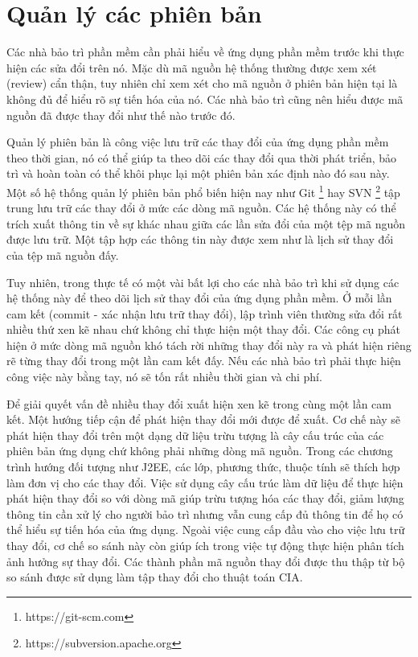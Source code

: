 \documentclass[12pt]{report}
\begin{document}
\chapter{Quản lý các phiên bản}
Các nhà bảo trì phần mềm cần phải hiểu về ứng dụng phần mềm trước khi thực hiện các sửa đổi trên nó. Mặc dù mã nguồn hệ thống thường được xem xét (review) cẩn thận, tuy nhiên chỉ xem xét cho mã nguồn ở phiên bản hiện tại là không đủ để hiểu rõ sự tiến hóa của nó. Các nhà bảo trì cũng nên hiểu được mã nguồn đã được thay đổi như thế nào trước đó.

Quản lý phiên bản là công việc lưu trữ các thay đổi của ứng dụng phần mềm theo thời gian, nó có thể giúp ta theo dõi các thay đổi qua thời phát triển, bảo trì và hoàn toàn có thể khôi phục lại một phiên bản xác định nào đó sau này. Một số hệ thống quản lý phiên bản phổ biến hiện nay như Git \footnote{https://git-scm.com} hay SVN  \footnote{https://subversion.apache.org} tập trung lưu trữ các thay đổi ở mức các dòng mã nguồn. Các hệ thống này có thể trích xuất thông tin về sự khác nhau giữa các lần sửa đổi của một tệp mã nguồn được lưu trữ. Một tập hợp các thông tin này được xem như là lịch sử thay đổi của tệp mã nguồn đấy.

Tuy nhiên, trong thực tế có một vài bất lợi cho các nhà bảo trì khi sử dụng các hệ thống này để theo dõi lịch sử thay đổi của ứng dụng phần mềm. Ở mỗi lần cam kết (commit - xác nhận lưu trữ thay đổi), lập trình viên thường sửa đổi rất nhiều thứ xen kẽ nhau chứ không chỉ thực hiện một thay đổi. Các công cụ phát hiện ở mức dòng mã nguồn khó tách rời những thay đổi này ra và phát hiện riêng rẽ từng thay đổi trong một lần cam kết đấy. Nếu các nhà bảo trì phải thực hiện công việc này bằng tay, nó sẽ tốn rất nhiều thời gian và chi phí.

Để giải quyết vấn đề nhiều thay đổi xuất hiện xen kẽ trong cùng một lần cam kết. Một hướng tiếp cận để phát hiện thay đổi mới được để xuất. Cơ chế này sẽ phát hiện thay đổi trên một dạng dữ liệu trừu tượng là cây cấu trúc của các phiên bản ứng dụng chứ không phải những dòng mã nguồn. Trong các chương trình hướng đối tượng như J2EE, các lớp, phương thức, thuộc tính sẽ thích hợp làm đơn vị cho các thay đổi. Việc sử dụng cây cấu trúc làm dữ liệu để thực hiện phát hiện thay đổi so với dòng mã giúp trừu tượng hóa các thay đổi, giảm lượng thông tin cần xử lý cho người bảo trì nhưng vẫn cung cấp đủ thông tin để họ có thể hiểu sự tiến hóa của ứng dụng. Ngoài việc cung cấp đầu vào cho việc lưu trữ thay đổi, cơ chế so sánh này còn giúp ích trong việc tự động thực hiện phân tích ảnh hưởng sự thay đổi. Các thành phần mã nguồn thay đổi được thu thập từ bộ so sánh được sử dụng làm tập thay đổi cho thuật toán CIA.
\end{document}
